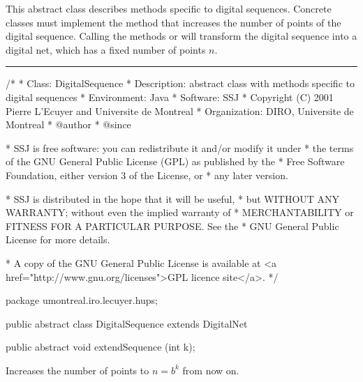 
This abstract class describes methods specific to digital sequences.
Concrete classes must implement the  method
that increases the number of points of the digital sequence.
Calling the  methods  or 
will transform the digital sequence into a digital net, which has
a fixed number of points $n$.

\bigskip\hrule\bigskip

\begin{code}
\begin{hide}
/*
 * Class:        DigitalSequence
 * Description:  abstract class with methods specific to digital sequences
 * Environment:  Java
 * Software:     SSJ 
 * Copyright (C) 2001  Pierre L'Ecuyer and Universite de Montreal
 * Organization: DIRO, Universite de Montreal
 * @author       
 * @since

 * SSJ is free software: you can redistribute it and/or modify it under
 * the terms of the GNU General Public License (GPL) as published by the
 * Free Software Foundation, either version 3 of the License, or
 * any later version.

 * SSJ is distributed in the hope that it will be useful,
 * but WITHOUT ANY WARRANTY; without even the implied warranty of
 * MERCHANTABILITY or FITNESS FOR A PARTICULAR PURPOSE.  See the
 * GNU General Public License for more details.

 * A copy of the GNU General Public License is available at
   <a href="http://www.gnu.org/licenses">GPL licence site</a>.
 */
\end{hide}
package umontreal.iro.lecuyer.hups;


public abstract class DigitalSequence extends DigitalNet \begin{hide} { 

\end{hide}

   public abstract void extendSequence (int k);
\end{code} 
\begin{tabb}
    Increases the number of points to $n = b^k$ from now on.
\end{tabb}
\begin{htmlonly}
\end{htmlonly}
